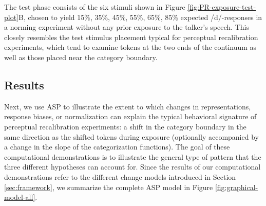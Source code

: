 \documentclass[
  11pt,
  man,floatsintext]{apa6}
\begin{document}
The test phase consists of the six stimuli shown in Figure \ref{fig:PR-exposure-test-plot}B, chosen to yield 15\%, 35\%, 45\%, 55\%, 65\%, 85\% expected /d/-responses in a norming experiment without any prior exposure to the talker's speech. This closely resembles the test stimulus placement typical for perceptual recalibration experiments, which tend to examine tokens at the two ends of the continuum as well as those placed near the category boundary.

\hypertarget{results}{%
\subsection{Results}\label{results}}

Next, we use ASP to illustrate the extent to which changes in representations, response biases, or normalization can explain the typical behavioral signature of perceptual recalibration experiments: a shift in the category boundary in the same direction as the shifted tokens during exposure (optionally accompanied by a change in the slope of the categorization functions). The goal of these computational demonstrations is to illustrate the general type of pattern that the three different hypotheses can account for. Since the results of our computational demonstrations refer to the different change models introduced in Section \ref{sec:framework}, we summarize the complete ASP model in Figure \ref{fig:graphical-model-all}.
\end{document}
